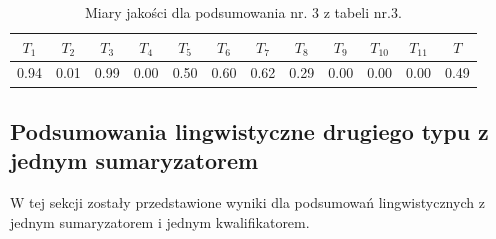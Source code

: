 \documentclass{article}
\begin{document}
\begin{table}[H]
    \centering
    \begin{tabular}{|c|c|c|c|c|c|c|c|c|c|c|c|}
    \hline
    \textbf{\(T_1\)} &\textbf{\(T_2\)} & \textbf{\(T_3\)} & \textbf{\(T_4\)} & \textbf{\(T_5\)} & \textbf{\(T_6\)} & \textbf{\(T_7\)} & \textbf{\(T_8\)} & \textbf{\(T_9\)} & \textbf{\(T_{10}\)} & \textbf{\(T_{11}\)} & \textbf{\(T\)} \\ \hline
    0.94 & 0.01 & 0.99 & 0.00 & 0.50 & 0.60 & 0.62 & 0.29 & 0.00 & 0.00 & 0.00 & 0.49 \\ \hline
    \end{tabular}
    \caption{Miary jakości dla podsumowania nr. 3 z tabeli nr.3.}
\end{table}  


\subsection{Podsumowania lingwistyczne drugiego typu z jednym sumaryzatorem}
W tej sekcji zostały przedstawione wyniki dla podsumowań lingwistycznych z jednym sumaryzatorem i jednym kwalifikatorem.
\end{document}
